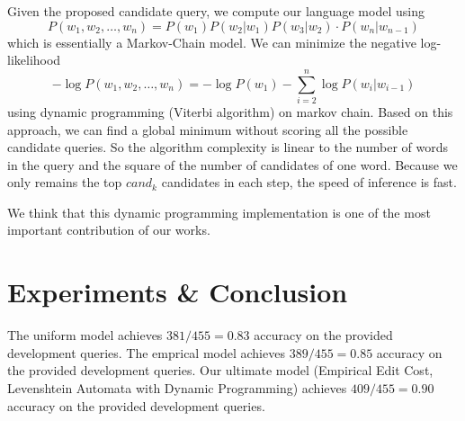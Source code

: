 Given the proposed candidate query, we compute our language model using
\begin{equation}\label{eq:3}
P(w_1, w_2, \dots, w_n) = P(w_1) P(w_2 | w_1) P(w_3 | w_2) \cdot P(w_n | w_{n-1})
\end{equation}
which is essentially a Markov-Chain model. We can minimize the negative log-likelihood
\begin{equation}\label{eq:4}
-\log P(w_1, w_2, \dots, w_n) = -\log P(w_1) - \sum_{i=2}^n \log P(w_i | w_{i-1})
\end{equation}
using dynamic programming (Viterbi algorithm) on markov chain. Based on this approach,
we can find a global minimum without scoring all the possible candidate queries.
So the algorithm complexity is linear to the number of words in the query and the square of the number of candidates of one word. Because we only remains the top $cand_k$ candidates in each step, the speed of inference is fast. 

We think that this dynamic programming implementation is one of the most important contribution of our works.


\section{Experiments \& Conclusion}
The uniform model achieves $381/455 = 0.83$ accuracy on the provided development queries.
The emprical model achieves $389/455 = 0.85$ accuracy on the provided development queries.
Our ultimate model (Empirical Edit Cost, Levenshtein Automata with Dynamic Programming) achieves $409/455 = 0.90$ accuracy on the provided development queries.




